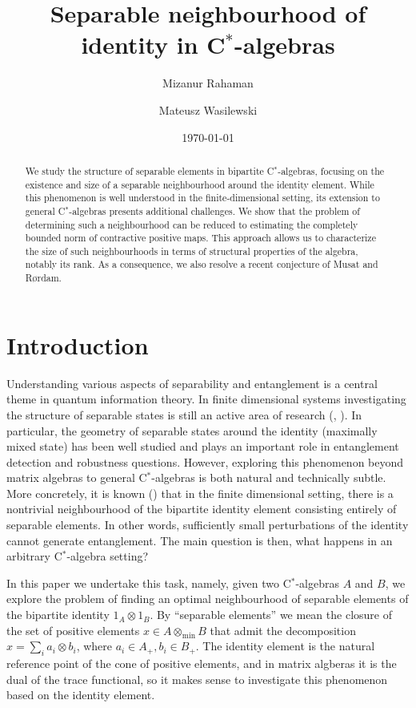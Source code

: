 \documentclass[11pt]{article}
\title{Separable neighbourhood of identity in C$^*$-algebras}
\author [1, 2]{Mizanur Rahaman}
\author [3]{Mateusz Wasilewski}
\affil [1]{Wallenberg Centre for Quantum Technology, Chalmers University of Technology}
\affil [2]{Department of Mathematical Sciences, Chalmers University of Technology}
\affil [3] {Institute of Mathematics of the Polish Academy of Sciences}
\date{\today}
\numberwithin{theorem}{section}
\begin{document}
\maketitle

\begin{abstract}
We study the structure of separable elements in bipartite C$^*$-algebras, focusing on the existence and size of a separable neighbourhood around the identity element. While this phenomenon is well understood in the finite-dimensional setting, its extension to general C$^*$-algebras presents additional challenges. We show that the problem of determining such a neighbourhood can be reduced to estimating the completely bounded norm of contractive positive maps. This approach allows us to characterize the size of such neighbourhoods in terms of structural properties of the algebra, notably its rank. As a consequence, we also resolve a recent conjecture of Musat and R\o{}rdam.
\end{abstract}
\section{Introduction} 

Understanding various aspects of separability and entanglement is a central theme in quantum information theory. In finite dimensional systems investigating the structure of separable states is still an active area of research (\cite{winter}, \cite{Chen}). In particular, the geometry of separable states around the identity (maximally mixed state) has been well studied and plays an important role in entanglement detection and robustness questions. However, exploring this phenomenon beyond matrix algebras to general C$^*$-algebras is both natural and technically subtle. More concretely, it is known (\cite{Gurvits-Barnum}) that in the finite dimensional setting, there is a nontrivial neighbourhood of the bipartite identity element consisting entirely of separable elements. In other words, sufficiently small perturbations of the identity cannot generate entanglement. The main question is then, what happens in an arbitrary C$^*$-algebra setting?

In this paper we undertake this task, namely, given two C$^*$-algebras $A$ and $B$, we explore the problem of finding an optimal neighbourhood of separable elements of the  bipartite identity $1_A\otimes 1_B$. By ``separable elements'' we mean the closure of the set of positive elements $x\in A\otimes_{\min} B$ that admit the decomposition $x=\sum_i a_i\otimes b_i$, where $a_i\in A_{+}, b_i\in B_{+}$. The identity element is the natural reference point of the cone of positive elements, and in matrix algberas it is the dual of the trace functional, so it makes sense to investigate this phenomenon based on the identity element. 
\end{document}
